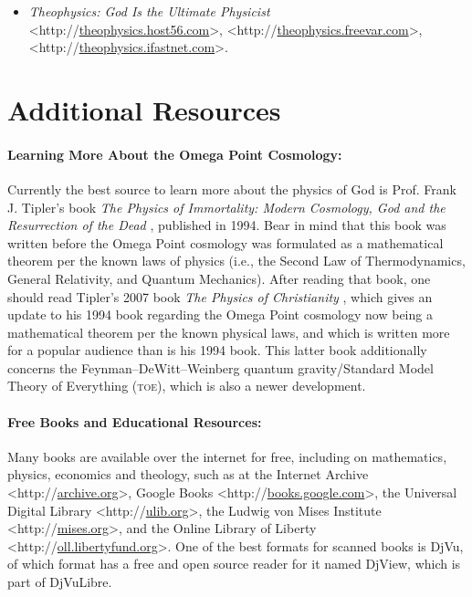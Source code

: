 \documentclass[letterpaper,12pt]{article}
\newcommand{\dsc}{\discretionary{}{}{}}
\begin{document}
\begin{itemize}
\small
\item \emph{Theophysics: God Is the Ultimate Physicist} \textless http://\dsc \href{http://theophysics.host56.com}{theophysics.host56.com}\textgreater , \textless http://\dsc \href{http://theophysics.freevar.com}{theophysics.freevar.com}\textgreater , \textless http://\dsc \href{http://theophysics.ifastnet.com}{theophysics.ifastnet.com}\textgreater .
\end{itemize}

\section{Additional Resources}
\label{sec:AdditionalResources}

\paragraph{Learning More About the Omega Point Cosmology:}
\label{parag:LearningMoreAboutOmegaPoint}

Currently the best source to learn more about the physics of God is Prof. Frank J. Tipler's book \emph{The Physics of Immortality: Modern Cosmology, God and the Resurrection of the Dead} \cite{Tipler1994}, published in 1994. Bear in mind that this book was written before the Omega Point cosmology was formulated as a mathematical theorem per the known laws of physics (i.e., the Second Law of Thermodynamics, General Relativity, and Quantum Mechanics). After reading that book, one should read Tipler's 2007 book \emph{The Physics of Christianity} \cite{Tipler2007}, which gives an update to his 1994 book regarding the Omega Point cosmology now being a mathematical theorem per the known physical laws, and which is written more for a popular audience than is his 1994 book. This latter book additionally concerns the Feynman--DeWitt--Weinberg quantum gravity\slash Standard Model Theory of Everything (\textsc{toe}), which is also a newer development.

\paragraph{Free Books and Educational Resources:}
\label{parag:FreeBooksAndEducationalResources}

Many books are available over the internet for free, including on mathematics, physics, economics and theology, such as at the Internet Archive \textless http://\dsc \href{http://archive.org}{archive.org}\textgreater , Google Books \textless http://\dsc \href{http://books.google.com}{books.google.com}\textgreater , the Universal Digital Library \textless http://\dsc \href{http://ulib.org}{ulib.org}\textgreater , the Ludwig von Mises Institute \textless http://\dsc \href{http://mises.org}{mises.org}\textgreater , and the Online Library of Liberty \textless http://\dsc \href{http://oll.libertyfund.org}{oll.libertyfund.org}\textgreater . One of the best formats for scanned books is DjVu, of which format has a free and open source reader for it named DjView, which is part of DjVuLibre.
\end{document}
